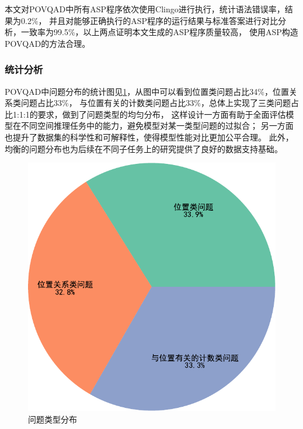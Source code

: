 本文对POVQAD中所有ASP程序依次使用Clingo进行执行，统计语法错误率，结果为0.2\%，
并且对能够正确执行的ASP程序的运行结果与标准答案进行对比分析，一致率为99.5\%，以上两点证明本文生成的ASP程序质量较高，
使用ASP构造POVQAD的方法合理。
\subsubsection{统计分析}
POVQAD中问题分布的统计图见\ref{fig:question_statistics}，从图中可以看到位置类问题占比34\%，位置关系类问题占比33\%，
与位置有关的计数类问题占比33\%，总体上实现了三类问题占比1:1:1的要求，做到了问题类型的均匀分布，
这样设计一方面有助于全面评估模型在不同空间推理任务中的能力，避免模型对某一类型问题的过拟合；
另一方面也提升了数据集的科学性和可解释性，使得模型性能对比更加公平合理。
此外，均衡的问题分布也为后续在不同子任务上的研究提供了良好的数据支持基础。
\begin{figure}[h]
    \centering
    \includegraphics[scale=0.6]{figures/三种类型问题占比-crop.pdf}
    \caption{问题类型分布}
    \label{fig:question_statistics}
\end{figure}
